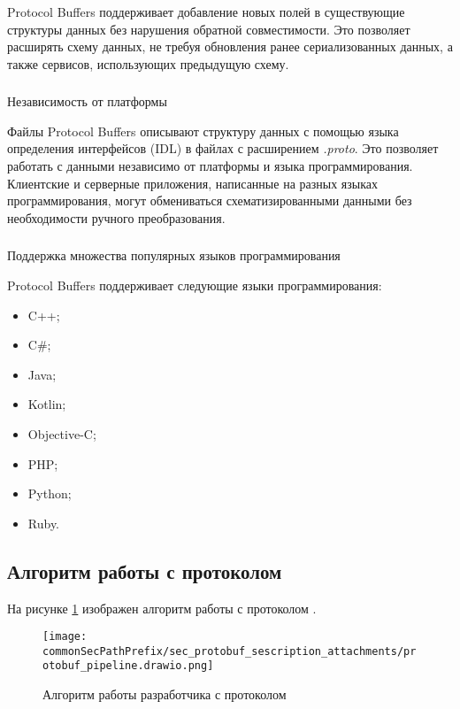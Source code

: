Protocol Buffers поддерживает добавление новых полей в существующие структуры данных без нарушения обратной совместимости.
Это позволяет расширять схему данных, не требуя обновления ранее сериализованных данных, а также сервисов, использующих предыдущую схему.

\subsubsection{} Независимость от платформы

Файлы Protocol Buffers описывают структуру данных с помощью языка определения интерфейсов (IDL) в файлах с расширением \textit{.proto}.
Это позволяет работать с данными независимо от платформы и языка программирования.
Клиентские и серверные приложения, написанные на разных языках программирования, могут обмениваться схематизированными данными без необходимости ручного преобразования.

\newpage
\subsubsection{} Поддержка множества популярных языков программирования

Protocol Buffers поддерживает следующие языки программирования:
\begin{itemize}
    \item C++;
    \item C\#;
    \item Java;
    \item Kotlin;
    \item Objective-C;
    \item PHP;
    \item Python;
    \item Ruby.
\end{itemize}

\subsection{Алгоритм работы с протоколом}

На рисунке \ref{fig:protobuf_algo} изображен алгоритм работы с протоколом \cite{protobuf_doc}.
\begin{figure}[ht]
    \centering
    \texttt{[image: \\commonSecPathPrefix/sec\_protobuf\_sescription\_attachments/protobuf\_pipeline.drawio.png]}
    \caption{Алгоритм работы разработчика с протоколом}
    \label{fig:protobuf_algo}
\end{figure}


